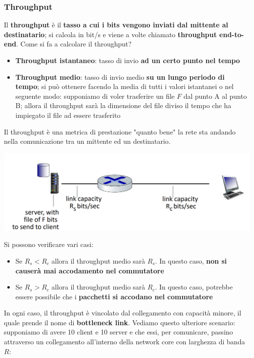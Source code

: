 \documentclass[12pt]{article}
\begin{document}
\subsubsection{Throughput}
Il \textbf{throughput} è il \textbf{tasso a cui i bits vengono inviati dal mittente al destinatario}; si calcola in bit/s e viene a volte chiamato \textbf{throughput end-to-end}.
Come si fa a calcolare il throughput?
\begin{itemize}
    \item \textbf{Throughput istantaneo}: tasso di invio \textbf{ad un certo punto nel tempo}
    \item \textbf{Throughput medio}: tasso di invio medio \textbf{su un lungo periodo di tempo}; si può ottenere facendo la media di tutti i valori istantanei o nel seguente modo: supponiamo di voler trasferire un file $F$ dal punto A al punto B; allora il throughput sarà la dimensione del file diviso il tempo che ha impiegato il file ad essere trasferito 
\end{itemize}
Il throughput è una metrica di prestazione "quanto bene" la rete sta andando nella comunicazione tra un mittente ed un destinatario.
\begin{center}
    \includegraphics[width =1\linewidth]{Images/22.PNG}
\end{center}
Si possono verificare vari casi:
\begin{itemize}
    \item Se $R_s < R_c$ allora il throughput medio sarà $R_s$. In questo caso, \textbf{non si causerà mai accodamento nel commutatore}
    \item Se $R_s > R_c$ allora il throughput medio sarà $R_c$. In questo caso, potrebbe essere possibile che i \textbf{pacchetti si accodano nel commutatore}
\end{itemize}
In ogni caso, il throughput è vincolato dal collegamento con capacità minore, il quale prende il nome di \textbf{bottleneck link}. Vediamo questo ulteriore scenario:
supponiamo di avere 10 client e 10 server e che essi, per comunicare, passino attraverso un collegamento all'interno della network core con larghezza di banda $R$:
\end{document}
